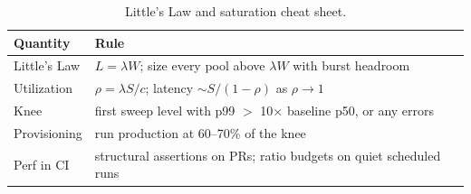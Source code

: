\begin{table}[htbp]
\centering\small
\begin{tabularx}{\textwidth}{l X}
\toprule
\textbf{Quantity} & \textbf{Rule} \\
\midrule
Little's Law & $L = \lambda W$; size every pool above $\lambda W$ with burst headroom \\
Utilization & $\rho = \lambda S / c$; latency $\sim S/(1-\rho)$ as $\rho \to 1$ \\
Knee & first sweep level with p99 $>$ 10$\times$ baseline p50, or any errors \\
Provisioning & run production at 60--70\% of the knee \\
Perf in CI & structural assertions on PRs; ratio budgets on quiet scheduled runs \\
\bottomrule
\end{tabularx}
\caption{Little's Law and saturation cheat sheet.}
\label{tab:ch19-little}
\end{table}


